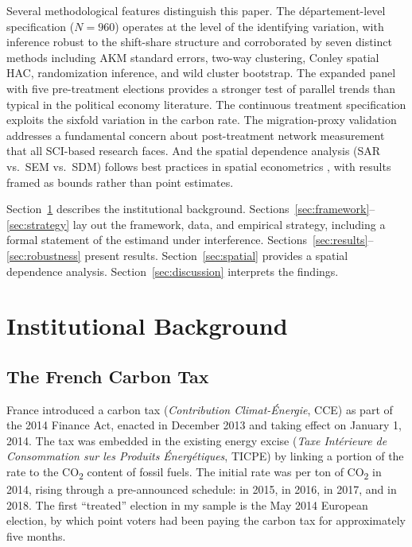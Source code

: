 \documentclass[12pt]{article}
\providecommand{\euro}{\texteuro}
\newcommand{\dept}{d\'{e}partement}
\begin{document}
Several methodological features distinguish this paper. The \dept{}-level specification ($N = 960$) operates at the level of the identifying variation, with inference robust to the shift-share structure \citep{adao2019shift} and corroborated by seven distinct methods including AKM standard errors, two-way clustering, Conley spatial HAC, randomization inference, and wild cluster bootstrap. The expanded panel with five pre-treatment elections provides a stronger test of parallel trends than typical in the political economy literature. The continuous treatment specification exploits the sixfold variation in the carbon rate. The migration-proxy validation addresses a fundamental concern about post-treatment network measurement that all SCI-based research faces. And the spatial dependence analysis (SAR vs.\ SEM vs.\ SDM) follows best practices in spatial econometrics \citep{lesage2009introduction, anselin1988spatial}, with results framed as bounds rather than point estimates.

Section~\ref{sec:background} describes the institutional background. Sections~\ref{sec:framework}--\ref{sec:strategy} lay out the framework, data, and empirical strategy, including a formal statement of the estimand under interference. Sections~\ref{sec:results}--\ref{sec:robustness} present results. Section~\ref{sec:spatial} provides a spatial dependence analysis. Section~\ref{sec:discussion} interprets the findings.



\section{Institutional Background}
\label{sec:background}

\subsection{The French Carbon Tax}

France introduced a carbon tax (\textit{Contribution Climat-\'{E}nergie}, CCE) as part of the 2014 Finance Act, enacted in December 2013 and taking effect on January 1, 2014. The tax was embedded in the existing energy excise (\textit{Taxe Int\'{e}rieure de Consommation sur les Produits \'{E}nerg\'{e}tiques}, TICPE) by linking a portion of the rate to the CO\textsubscript{2} content of fossil fuels. The initial rate was \euro 7 per ton of CO\textsubscript{2} in 2014, rising through a pre-announced schedule: \euro 14.50 in 2015, \euro 22 in 2016, \euro 30.50 in 2017, and \euro 44.60 in 2018. The first ``treated'' election in my sample is the May 2014 European election, by which point voters had been paying the carbon tax for approximately five months.
\end{document}
